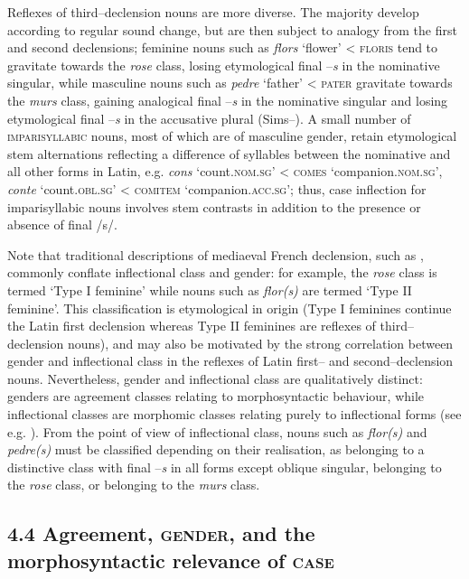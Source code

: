 \documentclass[output=paper]{langscibook}
\begin{document}
Reflexes of third–declension nouns are more diverse. The majority develop according to regular sound change, but are then subject to analogy from the first and second declensions; feminine nouns such as \textit{flors} ‘flower’ < \textsc{floris} tend to gravitate towards the \textit{rose} class, losing etymological final –\textit{s} in the nominative singular, while masculine nouns such as \textit{pedre} ‘father’ < \textsc{pater} gravitate towards the \textit{murs} class, gaining analogical final –\textit{s} in the nominative singular and losing etymological final –\textit{s} in the accusative plural (Sims–\citealt{WilliamsBaerman2021}). A small number of \textsc{imparisyllabic} nouns, most of which are of masculine gender, retain etymological stem alternations reflecting a difference of syllables between the nominative and all other forms in Latin, e.g. \textit{cons} ‘count.\textsc{nom.sg}’ < \textsc{comes} ‘companion.\textsc{nom.sg’}, \textit{conte} ‘count.\textsc{obl.sg’} < \textsc{comitem} ‘companion.\textsc{acc.sg’;} thus, case inflection for imparisyllabic nouns involves stem contrasts in addition to the presence or absence of final /s/.

Note that traditional descriptions of mediaeval French declension, such as \citet{Buridant2019}, commonly conflate inflectional class and gender: for example, the \textit{rose} class is termed ‘Type I feminine’ while nouns such as \textit{flor(s)} are termed ‘Type II feminine’. This classification is etymological in origin (Type I feminines continue the Latin first declension whereas Type II feminines are reflexes of third–declension nouns), and may also be motivated by the strong correlation between gender and inflectional class in the reflexes of Latin first– and second–declension nouns. Nevertheless, gender and inflectional class are qualitatively distinct: genders are agreement classes relating to morphosyntactic behaviour, while inflectional classes are morphomic classes relating purely to inflectional forms (see e.g. \citealt{Corbett2012}). From the point of view of inflectional class, nouns such as \textit{flor(s)} and \textit{pedre(s)} must be classified depending on their realisation, as belonging to a distinctive class with final –\textit{s} in all forms except oblique singular, belonging to the \textit{rose} class, or belonging to the \textit{murs} class.

\subsection{4.4 \textsc{A}greement, \textsc{gender}, and the morphosyntactic relevance of \textsc{case}}
\end{document}
